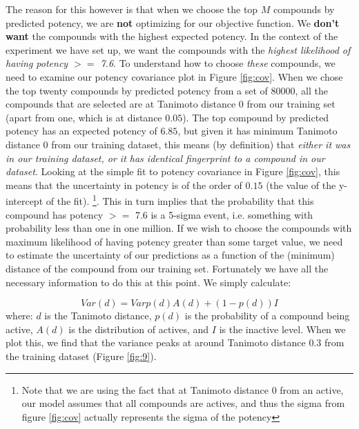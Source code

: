 \documentclass[journal=jacsat,manuscript=article]{achemso}
\begin{document}
The reason for this however is that when we choose the top $M$ compounds by predicted potency, we are \textbf{not} optimizing for our objective function.  We \textbf{don't want} the compounds with the highest expected potency.  In the context of the experiment we have set up, we want the compounds with the \textit{highest likelihood of having potency $>=$ 7.6}.  To understand how to choose \textit{these} compounds, we need to examine our potency covariance plot in Figure \ref{fig:cov}.
When we chose the top twenty compounds by predicted potency from a set of $80000$, all the compounds that are selected are at Tanimoto distance 0 from our training set (apart from one, which is at distance $0.05$).  The top compound by predicted potency has an expected potency of $6.85$, but given it has minimum Tanimoto distance 0 from our training dataset, this means (by definition) that \textit{either it was in our training dataset, or it has identical fingerprint to a compound in our dataset}. Looking at the simple fit to potency covariance in Figure \ref{fig:cov}, this means that the uncertainty in potency is of the order of $0.15$ (the value of the y-intercept of the fit). \footnote{Note that we are using the fact that at Tanimoto distance 0 from an active, our model assumes that all compounds are actives, and thus the sigma from figure \ref{fig:cov} actually represents the sigma of the potency}.  This in turn implies that the probability that this compound has potency $>=$ 7.6 is a 5-sigma event, i.e. something with probability less than one in one million.
If we wish to choose the compounds with maximum likelihood of having potency greater than some target value, we need to estimate the uncertainty of our predictions as a function of the (minimum) distance of the compound from our training set.  Fortunately we have all the necessary information to do this at this point. We simply calculate:

\begin{equation}
    Var(d) = Var{ p(d)A(d) + (1-p(d))I }
\end{equation}
where: $d$ is the Tanimoto distance, $p(d)$ is the probability of a compound being active, $A(d)$ is the distribution of actives, and $I$ is the inactive level.  When we plot this, we find that the variance peaks at around Tanimoto distance $0.3$ from the training dataset (Figure \ref{fig:9}).

\end{document}
